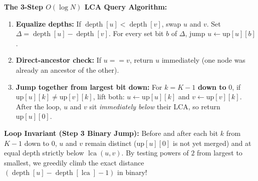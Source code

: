 \documentclass[11pt,a4paper]{article}
\theoremstyle{definition}
\newcommand{\invariantbeat}[1]{\par\noindent\textbf{\color{accentteal}Loop Invariant (#1):} }
\begin{document}
\textbf{The 3-Step $O(\log N)$ LCA Query Algorithm:}
\begin{enumerate}
    \item \textbf{Equalize depths:} If $\operatorname{depth}[u] < \operatorname{depth}[v]$, swap $u$ and $v$. Set $\Delta = \operatorname{depth}[u] - \operatorname{depth}[v]$. For every set bit $b$ of $\Delta$, jump $u \gets \text{up}[u][b]$.
    \item \textbf{Direct-ancestor check:} If $u == v$, return $u$ immediately (one node was already an ancestor of the other).
    \item \textbf{Jump together from largest bit down:} For $k = K - 1$ \textbf{down to} $0$, if $\text{up}[u][k] \ne \text{up}[v][k]$, lift both: $u \gets \text{up}[u][k]$ and $v \gets \text{up}[v][k]$. After the loop, $u$ and $v$ sit \emph{immediately below} their LCA, so return $\text{up}[u][0]$.
\end{enumerate}

\invariantbeat{Step 3 Binary Jump} Before and after each bit $k$ from $K - 1$ down to $0$, $u$ and $v$ remain distinct ($\text{up}[u][0]$ is not yet merged) and at equal depth strictly below $\operatorname{lca}(u, v)$. By testing powers of $2$ from largest to smallest, we greedily climb the exact distance $(\operatorname{depth}[u] - \operatorname{depth}[\operatorname{lca}] - 1)$ in binary!
\end{document}
